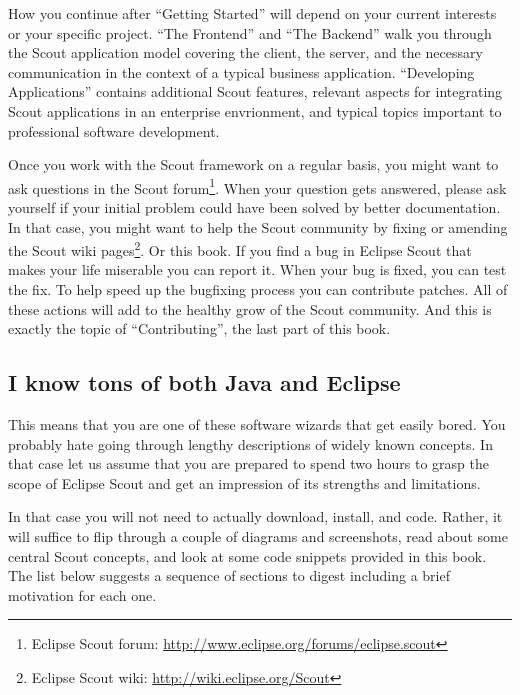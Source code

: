 \documentclass[a4paper,10pt,twoside]{book}
\begin{document}
How you continue after ``Getting Started'' will depend on your current interests or your specific project. 
``The Frontend'' and ``The Backend'' walk you through the Scout application model covering the client, the server, and the necessary communication in the context of a typical business application.
``Developing Applications'' contains additional Scout features, relevant aspects for integrating Scout applications in an enterprise envrionment, and typical topics important to professional software development.

Once you work with the Scout framework on a regular basis, you might want to ask questions in the Scout 
forum\footnote{Eclipse Scout forum: \url{http://www.eclipse.org/forums/eclipse.scout}}.
When your question gets answered, please ask yourself if your initial problem could have been solved by better documentation.
In that case, you might want to help the Scout community by fixing or amending the Scout wiki pages\footnote{Eclipse Scout wiki: \url{http://wiki.eclipse.org/Scout}}.
Or this book. 
If you find a bug in Eclipse Scout that makes your life miserable you can report it. 
When your bug is fixed, you can test the fix.
To help speed up the bugfixing process you can contribute patches.
All of these actions will add to the healthy grow of the Scout community.
And this is exactly the topic of ``Contributing'', the last part of this book.

\subsection{I know tons of both Java and Eclipse}

This means that you are one of these software wizards that get easily bored.
You probably hate going through lengthy descriptions of widely known concepts.
In that case let us assume that you are prepared to spend two hours to grasp the scope of Eclipse Scout and get an impression of its strengths and limitations.

In that case you will not need to actually download, install, and code. 
Rather, it will suffice to flip through a couple of diagrams and screenshots, read about some central Scout concepts, and look at some code snippets provided in this book.
The list below suggests a sequence of sections to digest including a brief motivation for each one.
\end{document}
